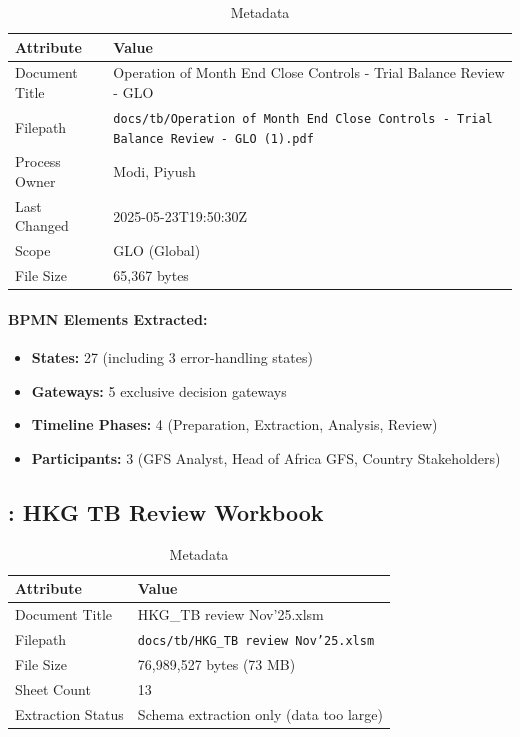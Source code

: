 \begin{table}[h]
\centering
\caption{ Metadata}
\begin{tabularx}{\textwidth}{@{}L{4cm}L{10cm}@{}}
\toprule
\textbf{Attribute} & \textbf{Value} \\
\midrule
Document Title & Operation of Month End Close Controls - Trial Balance Review - GLO \\
Filepath & \texttt{docs/tb/Operation of Month End Close Controls - Trial Balance Review - GLO (1).pdf} \\
Process Owner & Modi, Piyush \\
Last Changed & 2025-05-23T19:50:30Z \\
Scope & GLO (Global) \\
File Size & 65,367 bytes \\
\bottomrule
\end{tabularx}
\end{table}

\paragraph{BPMN Elements Extracted:}
\begin{itemize}[noitemsep]
  \item \textbf{States:} 27 (including 3 error-handling states)
  \item \textbf{Gateways:} 5 exclusive decision gateways
  \item \textbf{Timeline Phases:} 4 (Preparation, Extraction, Analysis, Review)
  \item \textbf{Participants:} 3 (GFS Analyst, Head of Africa GFS, Country Stakeholders)
\end{itemize}

\subsection{: HKG TB Review Workbook}
\label{sec:tb-wb-001}

\begin{table}[h]
\centering
\caption{ Metadata}
\begin{tabularx}{\textwidth}{@{}L{4cm}L{10cm}@{}}
\toprule
\textbf{Attribute} & \textbf{Value} \\
\midrule
Document Title & HKG\_TB review Nov'25.xlsm \\
Filepath & \texttt{docs/tb/HKG\_TB review Nov'25.xlsm} \\
File Size & 76,989,527 bytes (73 MB) \\
Sheet Count & 13 \\
Extraction Status & Schema extraction only (data too large) \\
\bottomrule
\end{tabularx}
\end{table}

